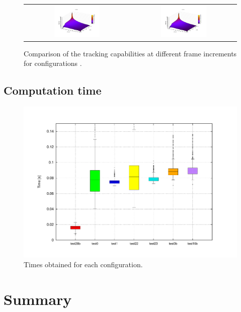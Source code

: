 \begin{figure}[h!]
\begin{tabular}{cc}
\includegraphics[width=0.45\textwidth,trim=50 40 80 60,clip]{recall_vs_delta_frames_vs_step_test28b}\label{fig:cp04_recall_vs_delta_frames_vs_step_test28b} &
\includegraphics[width=0.45\textwidth,trim=50 40 80 60,clip]{recall_vs_delta_frames_vs_step_test16b}\label{fig:cp04_recall_vs_delta_frames_vs_step_test16b}
\end{tabular}
\caption{Comparison of the tracking capabilities at different frame increments for configurations .}\label{fig:cp04_recall_vs_delta_frames_vs_step}
\end{figure}

\subsection{Computation time}\label{ch:chapter04_06_04}

\begin{figure}[h!]
\centering
\includegraphics[trim=50 40 80 60,clip]{times_average}
\caption{Times obtained for each configuration.}\label{fig:cp04_times_average}
\end{figure}



\section{Summary}\label{ch:chapter04_07}

